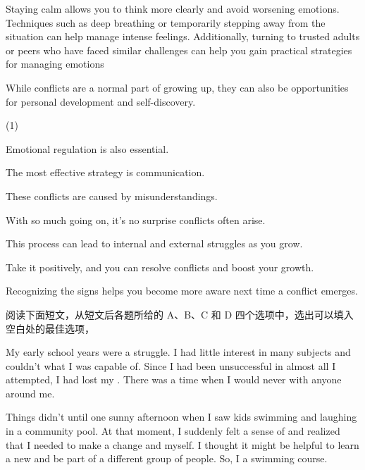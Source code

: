 \documentclass{英语试卷}
\begin{document}
\par {} Staying calm allows you to think more clearly and avoid worsening emotions. Techniques such as deep breathing or temporarily stepping away from the situation can help manage intense feelings. Additionally, turning to trusted adults or peers who have faced similar challenges can help you gain practical strategies for managing emotions\par
\par While conflicts are a normal part of growing up, they can also be opportunities for personal development and self-discovery. \par
\begin{choices}(1)
  \item Emotional regulation is also essential.
  \item The most effective strategy is communication.
  \item These conflicts are caused by misunderstandings.
  \item With so much going on, it's no surprise conflicts often arise.
  \item This process can lead to internal and external struggles as you grow.
  \item Take it positively, and you can resolve conflicts and boost your growth.
  \item Recognizing the signs helps you become more aware next time a conflict emerges.
\end{choices}
\par 阅读下面短文，从短文后各题所给的 A、B、C 和 D 四个选项中，选出可以填入空白处的最佳选项，\par
\par My early school years were a struggle. I had little interest in many subjects and couldn't  what I was capable of. Since I had been unsuccessful in almost all I attempted, I had lost my . There was a time when I would never  with anyone around me.\par
\par Things didn't  until one sunny afternoon when I saw kids swimming and laughing in a community pool. At that moment, I suddenly felt a sense of  and realized that I needed to make a change and  myself. I thought it might be helpful to learn a new  and be part of a different group of people. So, I  a swimming course.\par
\end{document}
